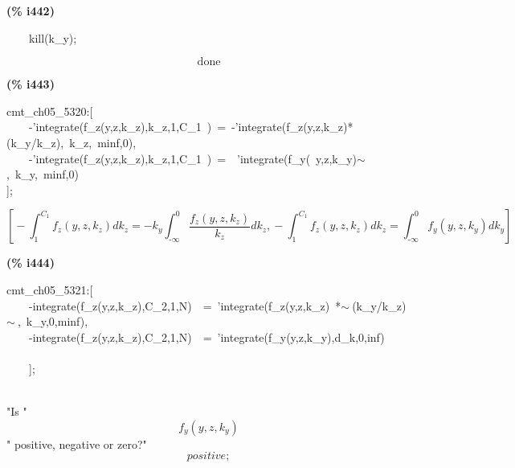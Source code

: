 \documentclass[fleqn]{article}
\begin{document}
\noindent
\begin{minipage}[t]{4.000000em}\color{red}\bfseries
(\% i442)	
\end{minipage}
\begin{minipage}[t]{\textwidth}\color{blue}
\ \ \ \ kill(k\_y);
\end{minipage}
\[\displaystyle \tag{\% o442} 
\ensuremath{\mathrm{done}}\mbox{}
\]


\noindent
\begin{minipage}[t]{4.000000em}\color{red}\bfseries
(\% i443)	
\end{minipage}
\begin{minipage}[t]{\textwidth}\color{blue}
cmt\_ch05\_5320:[\\
\ \ \ \ -'integrate(f\_z(y,z,k\_z),k\_z,1,C\_1\ )\ =\ -'integrate(f\_z(y,z,k\_z)*(k\_y/k\_z),\ k\_z,\ minf,0),\\
\ \ \ \ -'integrate(f\_z(y,z,k\_z),k\_z,1,C\_1\ )\ =\ \ 'integrate(f\_y(\ y,z,k\_y)\ensuremath{\sim\ },\ k\_y,\ minf,0)\\
];
\end{minipage}
\[\displaystyle \tag{\% o443} 
\operatorname{[}-\int_{1}^{{C_1}}{\left. {f_z}\left( y\operatorname{,}z\operatorname{,}{k_z}\right) d{k_z}\right.}=-{k_y} \int_{\operatorname{-}\infty }^{0}{\left. \frac{{f_z}\left( y\operatorname{,}z\operatorname{,}{k_z}\right) }{{k_z}}d{k_z}\right.}\operatorname{,}-\int_{1}^{{C_1}}{\left. {f_z}\left( y\operatorname{,}z\operatorname{,}{k_z}\right) d{k_z}\right.}=
\int_{\operatorname{-}\infty }^{0}{\left. {f_y}\left( y\operatorname{,}z\operatorname{,}{k_y}\right) d{k_y}\right.}\operatorname{]}\mbox{}
\]


\noindent
\begin{minipage}[t]{4.000000em}\color{red}\bfseries
(\% i444)	
\end{minipage}
\begin{minipage}[t]{\textwidth}\color{blue}
cmt\_ch05\_5321:[\\
\ \ \ \ -integrate(f\_z(y,z,k\_z),C\_2,1,N)\ \ =\ 'integrate(f\_z(y,z,k\_z)\ *\ensuremath{\sim\ }(k\_y/k\_z)\ensuremath{\sim\ },\ k\_y,0,minf),\\
\ \ \ \ -integrate(f\_z(y,z,k\_z),C\_2,1,N)\ \ =\ 'integrate(f\_y(y,z,k\_y),d\_k,0,inf)\\
\ \ \ \ \\
\ \ \ \ ];
\end{minipage}
\mbox{}\\"Is "
\[\displaystyle {f_y}\left( y\operatorname{,}z\operatorname{,}{k_y}\right) \mbox{}
\]" positive, negative or zero?"
\[\displaystyle positive;\mbox{}\]
\end{document}
